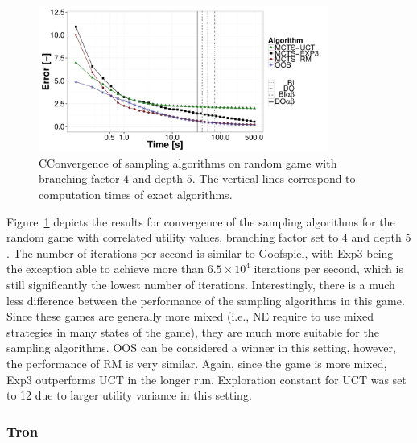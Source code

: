 \begin{figure}
\centering
\includegraphics[width=0.85\textwidth]{figures/convergence-rg.pdf}
\caption{CConvergence of sampling algorithms on random game with branching factor $4$ and depth $5$. The vertical lines correspond to computation times of exact algorithms.} \label{fig:off:conv:rg}
\end{figure}

Figure~\ref{fig:off:conv:rg} depicts the results for convergence of the sampling algorithms for the random game with correlated utility values, branching factor set to $4$ and depth $5$. 
The number of iterations per second is similar to Goofspiel, with Exp3 being the exception able to achieve more than $6.5\times10^4$ iterations per second, which is still significantly the lowest number of iterations.
Interestingly, there is a much less difference between the performance of the sampling algorithms in this game. 
Since these games are generally more mixed (i.e., NE require to use mixed strategies in many states of the game), they are much more suitable for the sampling algorithms. 
OOS can be considered a winner in this setting, however, the performance of RM is very similar. 
Again, since the game is more mixed, Exp3 outperforms UCT in the longer run. 
Exploration constant for UCT was set to 12 due to larger utility variance in this setting.

\subsubsection{Tron}

